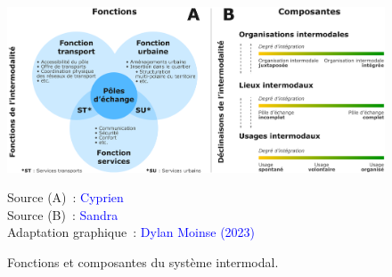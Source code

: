 \begin{refsegment}
    \begin{figure}[h!]\vspace*{4pt}
        \caption{Fonctions et composantes du système intermodal.}
        \label{fig-chap1:composantes-fonctions-intermodalite}
        \centerline{\includegraphics[width=1\columnwidth]{src/Figures/Chap-1/FR_Fonctions_Composants_Intermodalite.pdf}}
        \vspace{5pt}
        \begin{flushright}\scriptsize{
        Source (A)~: \textcolor{blue}{Cyprien} \textcolor{blue}{\textcite[14]{richer_lemergence_2008}}
        \\
        Source (B)~: \textcolor{blue}{Sandra} \textcolor{blue}{\textcite[167]{bozzani_grandes_2006}}
        \\
        Adaptation graphique~: \textcolor{blue}{Dylan Moinse (2023)}
        }\end{flushright}
    \end{figure}


\end{refsegment}
